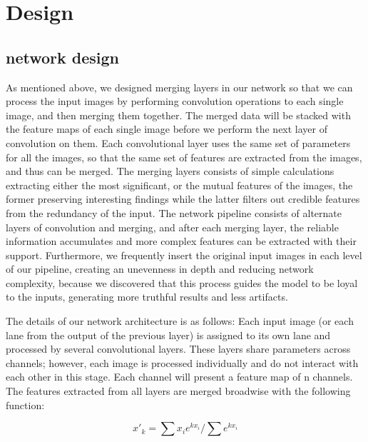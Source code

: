 \section{Design}
\label{sec-design}

\subsection{network design}

As mentioned above, we designed merging layers in our network so that we can process the input images by performing convolution operations to each single image, and then merging them together. The merged data will be stacked with the feature maps of each single image before we perform the next layer of convolution on them. Each convolutional layer uses the same set of parameters for all the images, so that the same set of features are extracted from the images, and thus can be merged. The merging layers consists of simple calculations extracting either the most significant, or the mutual features of the images, the former preserving interesting findings while the latter filters out credible features from the redundancy of the input. The network pipeline consists of alternate layers of convolution and merging, and after each merging layer, the reliable information accumulates and more complex features can be extracted with their support. Furthermore, we frequently insert the original input images in each level of our pipeline, creating an unevenness in depth and reducing network complexity, because we discovered that this process guides the model to be loyal to the inputs, generating more truthful results and less artifacts.

The details of our network architecture is as follows:
	Each input image (or each lane from the output of the previous layer) is assigned to its own lane and processed by several convolutional layers. These layers share parameters across channels; however, each image is processed individually and do not interact with each other in this stage. Each channel will present a feature map of n channels.
	The features extracted from all layers are merged broadwise with the following function:


    $${x'_k=\sum x_ie^{kx_i}/\sum e^{kx_i}}$$


